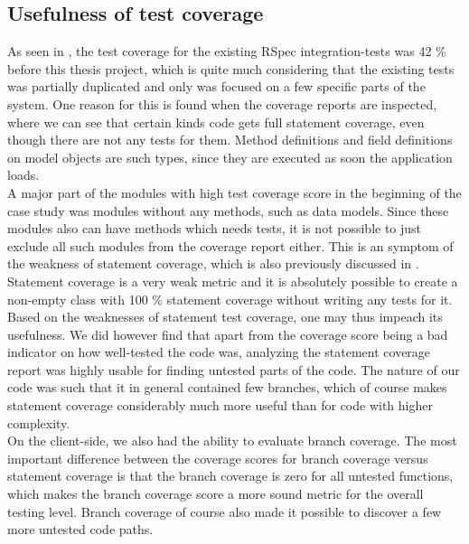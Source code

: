 
\subsection{Usefulness of test coverage}

As seen in , the test coverage for the
existing RSpec integration-tests was 42 \% before this thesis project,
which is quite much considering that the existing tests was partially
duplicated and only was focused on a few specific parts of the system.
One reason for this is found when the coverage reports are inspected,
where we can see that certain kinds code gets full statement coverage,
even though there are not any tests for them. Method definitions and
field definitions on model objects are such types, since they are
executed as soon the application loads.\\

A major part of the modules with high test coverage score in the
beginning of the case study was modules without any methods, such as
data models. Since these modules also can have methods which needs
tests, it is not possible to just exclude all such modules from the
coverage report either. This is an symptom of the weakness of statement
coverage, which is also previously discussed in
. Statement coverage is a very weak
metric and it is absolutely possible to create a non-empty class with
100 \% statement coverage without writing any tests for it.\\

Based on the weaknesses of statement test coverage, one may thus impeach
its usefulness. We did however find that apart from the coverage score
being a bad indicator on how well-tested the code was, analyzing the
statement coverage report was highly usable for finding untested parts
of the code. The nature of our code was such that it in general
contained few branches, which of course makes statement coverage
considerably much more useful than for code with higher complexity.\\

On the client-side, we also had the ability to evaluate branch coverage.
The most important difference between the coverage scores for branch
coverage versus statement coverage is that the branch coverage is zero
for all untested functions, which makes the branch coverage score a more
sound metric for the overall testing level. Branch coverage of course
also made it possible to discover a few more untested code paths.\\


